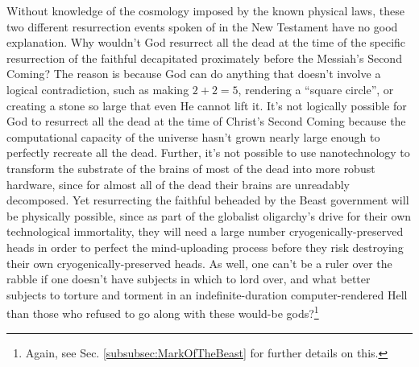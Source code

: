 \documentclass[letterpaper,12pt]{article}
\begin{document}
Without knowledge of the cosmology imposed by the known physical laws, these two different resurrection events spoken of in the New Testament have no good explanation. Why wouldn't God resurrect all the dead at the time of the specific resurrection of the faithful decapitated proximately before the Messiah's Second Coming? The reason is because God can do anything that doesn't involve a logical contradiction, such as making \( 2+2 = 5 \), rendering a ``square circle'', or creating a stone so large that even He cannot lift it. It's not logically possible for God to resurrect all the dead at the time of Christ's Second Coming because the computational capacity of the universe hasn't grown nearly large enough to perfectly recreate all the dead. Further, it's not possible to use nanotechnology to transform the substrate of the brains of most of the dead into more robust hardware, since for almost all of the dead their brains are unreadably decomposed. Yet resurrecting the faithful beheaded by the Beast government will be physically possible, since as part of the globalist oligarchy's drive for their own technological immortality, they will need a large number cryogenically-preserved heads in order to perfect the mind-uploading process before they risk destroying their own cryogenically-preserved heads. As well, one can't be a ruler over the rabble if one doesn't have subjects in which to lord over, and what better subjects to torture and torment in an indefinite-duration computer-rendered Hell than those who refused to go along with these would-be gods?\footnote{Again, see Sec. \ref{subsubsec:MarkOfTheBeast} for further details on this.}
\end{document}
